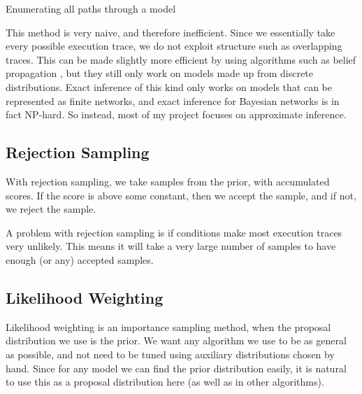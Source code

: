 \begin{listing}[ht]
	\caption{Enumerating all paths through a model}
	\label{lst:enum}
\end{listing}

This method is very naive, and therefore inefficient. Since we essentially take every possible execution trace, we do not exploit structure such as overlapping traces. This can be made slightly more efficient by using algorithms such as belief propagation \cite{belief-prop}, but they still only work on models made up from discrete distributions. Exact inference of this kind only works on models that can be represented as finite networks, and exact inference for Bayesian networks is in fact NP-hard\cite{cooper1990computational}. So instead, most of my project focuses on approximate inference.

\subsection{Rejection Sampling} \label{sec:rej}

With rejection sampling, we take samples from the prior, with accumulated scores. If the score is above some constant, then we accept the sample, and if not, we reject the sample. 


A problem with rejection sampling is if conditions make most execution traces very unlikely. This means it will take a very large number of samples to have enough (or any) accepted samples. 

\subsection{Likelihood Weighting} \label{sec:likelihood-wighting}

Likelihood weighting is an importance sampling method, when the proposal distribution we use is the prior. We want any algorithm we use to be as general as possible, and not need to be tuned using auxiliary distributions chosen by hand. Since for any model we can find the prior distribution easily, it is natural to use this as a proposal distribution here (as well as in other algorithms). 

